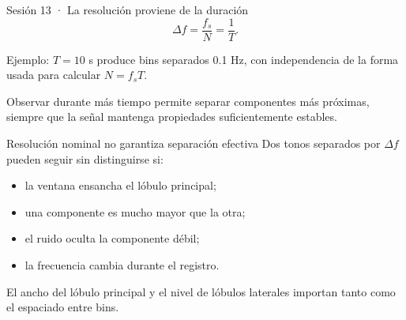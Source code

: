 \documentclass[
  ignorenonframetext,
  aspectratio=169,
  spanish,
]{beamer}
\providecommand{\faExclamation}{\faIcon{exclamation}}
\providecommand{\tightlist}{%
  \setlength{\itemsep}{0pt}\setlength{\parskip}{0pt}}
\begin{document}
\begin{frame}{Sesión 13 · La resolución proviene de la duración}
  \protect{}\label{sesiuxf3n-13-la-resoluciuxf3n-proviene-de-la-duraciuxf3n}
  \[\Delta f=\frac{f_s}{N}=\frac{1}{T}.\]

  Ejemplo: \(T=10\) s produce bins separados 0.1 Hz, con independencia de
  la forma usada para calcular \(N=f_sT\).

  \begin{tcolorbox}[enhanced jigsaw, arc=.35mm, bottomrule=.15mm, bottomtitle=1mm, breakable, colback=white, colbacktitle=quarto-callout-important-color!10!white, colframe=quarto-callout-important-color-frame, coltitle=black, left=2mm, leftrule=.75mm, opacityback=0, opacitybacktitle=0.6, rightrule=.15mm, title=\textcolor{quarto-callout-important-color}{\faExclamation}\hspace{0.5em}{Importante}, titlerule=0mm, toprule=.15mm, toptitle=1mm]

    Observar durante más tiempo permite separar componentes más próximas,
    siempre que la señal mantenga propiedades suficientemente estables.

  \end{tcolorbox}
\end{frame}

\begin{frame}{Resolución nominal no garantiza separación efectiva}
  \protect{}\label{resoluciuxf3n-nominal-no-garantiza-separaciuxf3n-efectiva}
  Dos tonos separados por \(\Delta f\) pueden seguir sin distinguirse si:

  \begin{itemize}
    \tightlist
    \item
          la ventana ensancha el lóbulo principal;
    \item
          una componente es mucho mayor que la otra;
    \item
          el ruido oculta la componente débil;
    \item
          la frecuencia cambia durante el registro.
  \end{itemize}

  \begin{tcolorbox}[enhanced jigsaw, arc=.35mm, bottomrule=.15mm, bottomtitle=1mm, breakable, colback=white, colbacktitle=quarto-callout-warning-color!10!white, colframe=quarto-callout-warning-color-frame, coltitle=black, left=2mm, leftrule=.75mm, opacityback=0, opacitybacktitle=0.6, rightrule=.15mm, title=\textcolor{quarto-callout-warning-color}{\faExclamationTriangle}\hspace{0.5em}{Advertencia}, titlerule=0mm, toprule=.15mm, toptitle=1mm]

    El ancho del lóbulo principal y el nivel de lóbulos laterales importan
    tanto como el espaciado entre bins.

  \end{tcolorbox}
\end{frame}
\end{document}
